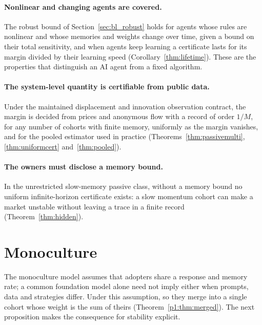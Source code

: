 \paragraph{Nonlinear and changing agents are covered.} The robust bound of Section~\ref{sec:bl_robust} holds for agents whose rules are nonlinear and whose memories and weights change over time, given a bound on their total sensitivity, and when agents keep learning a certificate lasts for its margin divided by their learning speed (Corollary~\ref{thm:lifetime}). These are the properties that distinguish an AI agent from a fixed algorithm.

\paragraph{The system-level quantity is certifiable from public data.} Under the maintained displacement and innovation observation contract, the margin is decided from prices and anonymous flow with a record of order $1/M$, for any number of cohorts with finite memory, uniformly as the margin vanishes, and for the pooled estimator used in practice (Theorems~\ref{thm:passivemulti}, \ref{thm:uniformcert} and~\ref{thm:pooled}).

\paragraph{The owners must disclose a memory bound.} In the unrestricted slow-memory passive class, without a memory bound no uniform infinite-horizon certificate exists: a slow momentum cohort can make a market unstable without leaving a trace in a finite record (Theorem~\ref{thm:hidden}).

\section{Monoculture}\label{sec:ai_mono}

The monoculture model assumes that adopters share a response and memory rate; a common foundation model alone need not imply either when prompts, data and strategies differ. Under this assumption, so they merge into a single cohort whose weight is the sum of theirs (Theorem~\ref{p1:thm:merged}). The next proposition makes the consequence for stability explicit.

